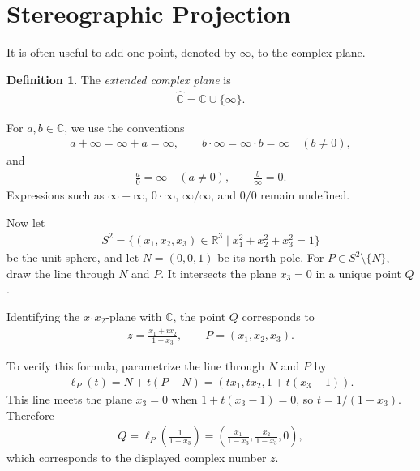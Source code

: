 \documentclass[11pt]{article}
\theoremstyle{plain}
\theoremstyle{definition}
\newtheorem{definition}[theorem]{Definition}
\theoremstyle{remark}
\numberwithin{equation}{section}
\newcommand{\be}{\begin{eqnarray}}
\newcommand{\ee}{\end{eqnarray}}
\newcommand{\C}{\mathbb{C}}
\newcommand{\R}{\mathbb{R}}
\begin{document}
\section{Stereographic Projection}


It is often useful to add one point, denoted by $\infty$, to the complex
plane.

\begin{definition}
The \emph{extended complex plane} is
\be
  \widehat{\C}=\C\cup\{\infty\}.
\ee
\end{definition}

For $a,b\in\C$, we use the conventions
\be
  a+\infty=\infty+a=\infty,
  \qquad
  b\cdot\infty=\infty\cdot b=\infty\quad (b\ne0),
\ee
and
\be
  \frac{a}{0}=\infty\quad (a\ne0),
  \qquad
  \frac{b}{\infty}=0.
\ee
Expressions such as $\infty-\infty$, $0\cdot\infty$, $\infty/\infty$, and
$0/0$ remain undefined.

Now let
\be
  S^2=\{(x_1,x_2,x_3)\in\R^3\mid x_1^2+x_2^2+x_3^2=1\}
\ee
be the unit sphere, and let $N=(0,0,1)$ be its north pole.  For
$P\in S^2\setminus\{N\}$, draw the line through $N$ and $P$.  It intersects
the plane $x_3=0$ in a unique point $Q$.

\begin{center}
\end{center}

Identifying the $x_1x_2$-plane with $\C$, the point $Q$ corresponds to
\be
  \boxed{\displaystyle
    z=\frac{x_1+i x_2}{1-x_3}
  },
  \qquad P=(x_1,x_2,x_3).
\ee

To verify this formula, parametrize the line through $N$ and $P$ by
\be
  \ell_P(t)=N+t(P-N)
  =(t x_1,t x_2,1+t(x_3-1)).
\ee
This line meets the plane $x_3=0$ when $1+t(x_3-1)=0$, so
$t=1/(1-x_3)$.  Therefore
\be
  Q=\ell_P\left(\frac{1}{1-x_3}\right)
  =\left(\frac{x_1}{1-x_3},\frac{x_2}{1-x_3},0\right),
\ee
which corresponds to the displayed complex number $z$.
\end{document}
